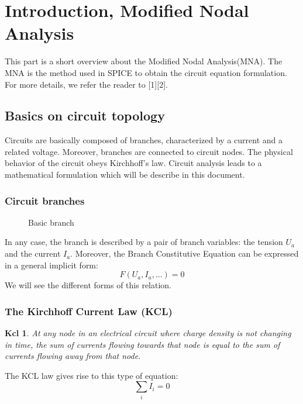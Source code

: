
 
\section{Introduction, Modified Nodal Analysis}
This part is a short overview about the Modified Nodal Analysis(MNA). The MNA is the method used
in SPICE to obtain the circuit equation formulation. For more details, we refer the reader to [1][2].%

\subsection{Basics on circuit topology}

Circuits are basically composed of branches, characterized by a current and a related voltage.
Moreover, branches are connected to circuit nodes. The physical behavior of the circuit obeys
Kirchhoff's law. Circuit analysis leads to a mathematical formulation which will be describe in this
document.

\subsubsection{Circuit branches}
\begin{figure}[h]
\centerline{
 \scalebox{0.6}{
    
 }
}
\caption{Basic branch}
\label{fig-Basic-branch}
\end{figure}
In any case, the branch is described by a pair of branch variables: the tension $U_{a}$ and the current $I_{a}$.
Moreover, the Branch Constitutive Equation can be expressed in a general implicit form:
\begin{equation}\label{BCE}F(U_{a},I_{a},...)=0\end{equation}
We will see the different forms of this relation.
\subsubsection{The Kirchhoff Current Law (KCL)}
\newtheorem{kcl}{Kcl}
\begin{kcl}
At any node in an electrical circuit where charge density is not changing in time, the sum of
currents flowing towards that node is equal to the sum of currents flowing away from that node.
\end{kcl}
The KCL law gives rise to this type of equation:\\
\begin{equation}
 \sum_{i} I_{i}=0\label{eq:KCL}
\end{equation}

